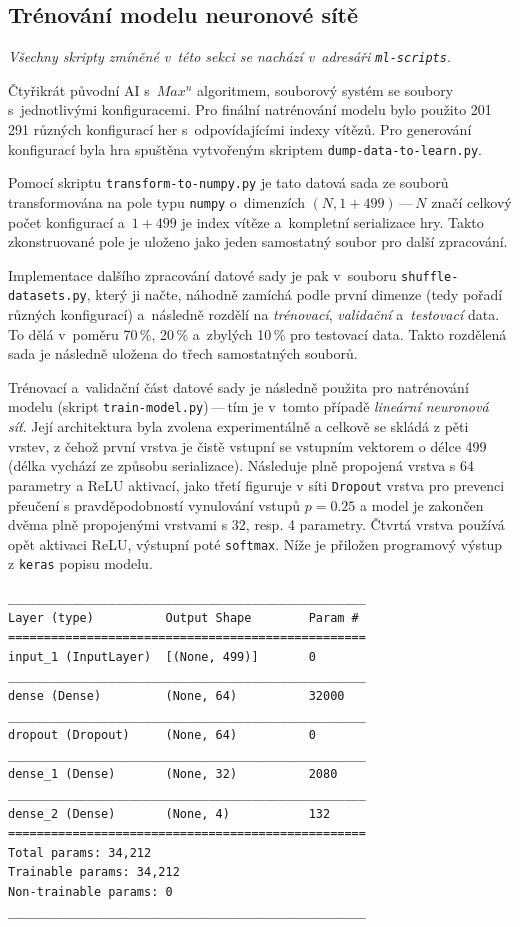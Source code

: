 \documentclass[11pt, a4paper]{article}
\theoremstyle{definition}
\begin{document}
\subsection{Trénování modelu neuronové sítě}
\label{sec:trainModel}

\textit{Všechny skripty zmíněné v~této sekci se nachází v~adresáři \texttt{ml-scripts}}.

Čtyřikrát původní AI s~$ Max^n $ algoritmem, souborový systém se soubory s~jednotlivými konfiguracemi. Pro finální natrénování modelu bylo použito 201\,291 různých konfigurací her s~odpovídajícími indexy vítězů. Pro generování konfigurací byla hra spuštěna vytvořeným skriptem \texttt{dump-data-to-learn.py}.

Pomocí skriptu \texttt{transform-to-numpy.py} je tato datová sada ze souborů transformována na pole typu \texttt{numpy} o~dimenzích $(N, 1 + 499)$\,---\,$N$ značí celkový počet konfigurací a~$1 + 499$ je index vítěze a~kompletní serializace hry. Takto zkonstruované pole je uloženo jako jeden samostatný soubor pro další zpracování.

Implementace dalšího zpracování datové sady je pak v~souboru \texttt{shuffle-datasets.py}, který ji načte, náhodně zamíchá podle první dimenze (tedy pořadí různých konfigurací) a~následně rozdělí na \emph{trénovací}, \emph{validační} a~\emph{testovací} data. To dělá v~poměru 70\,\%, 20\,\% a~zbylých 10\,\% pro testovací data. Takto rozdělená sada je následně uložena do třech samostatných souborů.

Trénovací a~validační část datové sady je následně použita pro natrénování modelu (skript \texttt{train-model.py})\,---\,tím je v~tomto případě \emph{lineární neuronová síť}. Její architektura byla zvolena experimentálně a celkově se skládá z pěti vrstev,
z čehož první vrstva je čistě vstupní se vstupním vektorem o délce 499 (délka vychází ze způsobu serializace). Následuje plně propojená vrstva s 64 parametry a ReLU aktivací, jako třetí figuruje v síti \texttt{Dropout} vrstva pro prevenci přeučení s pravděpodobností vynulování vstupů $p=0.25$ a model je zakončen dvěma plně propojenými vrstvami s 32, resp. 4 parametry. Čtvrtá vrstva používá opět aktivaci ReLU, výstupní poté \texttt{softmax}. Níže je přiložen programový výstup z \texttt{keras} popisu modelu. 

\begin{verbatim}
__________________________________________________
Layer (type)          Output Shape        Param #
==================================================
input_1 (InputLayer)  [(None, 499)]       0
__________________________________________________
dense (Dense)         (None, 64)          32000
__________________________________________________
dropout (Dropout)     (None, 64)          0
__________________________________________________
dense_1 (Dense)       (None, 32)          2080
__________________________________________________
dense_2 (Dense)       (None, 4)           132
==================================================
Total params: 34,212
Trainable params: 34,212
Non-trainable params: 0
__________________________________________________
\end{verbatim}
\end{document}
